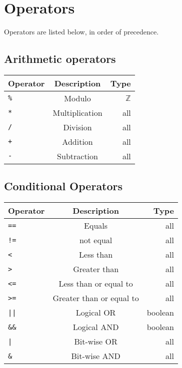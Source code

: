 \documentclass[
a4paper, %
11pt, %
onecolumn, %
openany, %
]{memoir}
\begin{document}
\section*{Operators}
Operators are listed below, in order of precedence.\\
\subsection*{Arithmetic operators}
\begin{tabular}{| l | c | r |}
\hline
Operator    & Description     & Type\\
\hline
\texttt{\%} & Modulo          & $\mathbb{Z}$ \\
\hline
\texttt{*}  & Multiplication  & all \\
\hline
\texttt{/}  & Division        & all \\
\hline
\texttt{+}  & Addition        & all \\
\hline
\texttt{-}  & Subtraction     & all \\
\hline
\end{tabular}

\subsection*{Conditional Operators}

\begin{tabular}{| l | c | r |}
\hline
Operator    & Description     & Type\\
\hline
\texttt{==} & Equals          & all \\
\hline
\texttt{!=} & not equal       & all \\
\hline
\texttt{<}  & Less than       & all \\
\hline
\texttt{>}  & Greater than    & all \\
\hline
\texttt{<=}  & Less than or equal to     & all \\
\hline
\texttt{>=}  & Greater than or equal to     & all \\
\hline
\texttt{||}  & Logical OR    & boolean \\
\hline
\texttt{\&\&}  & Logical AND   & boolean \\
\hline
\texttt{|}  & Bit-wise OR     & all \\
\hline
\texttt{\&}  & Bit-wise AND     & all \\
\hline
\end{tabular}
\end{document}
